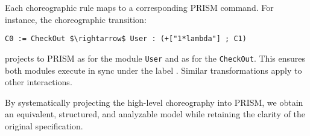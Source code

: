 Each choreographic rule maps to a corresponding PRISM command. For instance, the choreographic transition:

\begin{lstlisting}[style=chor-color]
C0 := CheckOut $\rightarrow$ User : (+["1*lambda"] ; C1)
\end{lstlisting}

projects to PRISM as 
 for the module \texttt{User} and as  for the \texttt{CheckOut}.
This ensures both modules execute in sync under the label . Similar transformations apply to other interactions.

By systematically projecting the high-level choreography into PRISM, we obtain an equivalent, structured, and analyzable model while retaining the clarity of the original specification. 

